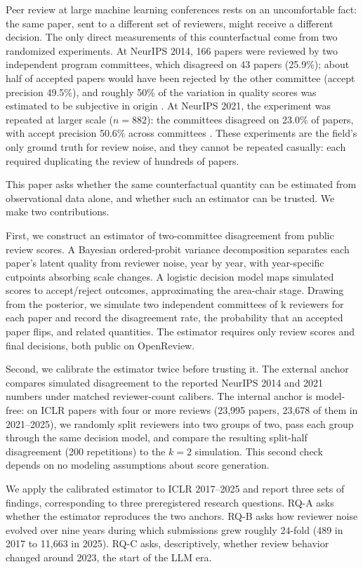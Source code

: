 \documentclass[10pt]{article}
\begin{document}
Peer review at large machine learning conferences rests on an uncomfortable fact: the same paper, sent to a different set of reviewers, might receive a different decision. The only direct measurements of this counterfactual come from two randomized experiments. At NeurIPS 2014, 166 papers were reviewed by two independent program committees, which disagreed on 43 papers (25.9\%); about half of accepted papers would have been rejected by the other committee (accept precision 49.5\%), and roughly 50\% of the variation in quality scores was estimated to be subjective in origin \citep{cortes2021}. At NeurIPS 2021, the experiment was repeated at larger scale ($n=882$): the committees disagreed on 23.0\% of papers, with accept precision 50.6\% across committees \citep{beygelzimer2023}. These experiments are the field's only ground truth for review noise, and they cannot be repeated casually: each required duplicating the review of hundreds of papers.

This paper asks whether the same counterfactual quantity can be estimated from observational data alone, and whether such an estimator can be trusted. We make two contributions.

First, we construct an estimator of two-committee disagreement from public review scores. A Bayesian ordered-probit variance decomposition separates each paper's latent quality from reviewer noise, year by year, with year-specific cutpoints absorbing scale changes. A logistic decision model maps simulated scores to accept/reject outcomes, approximating the area-chair stage. Drawing from the posterior, we simulate two independent committees of k reviewers for each paper and record the disagreement rate, the probability that an accepted paper flips, and related quantities. The estimator requires only review scores and final decisions, both public on OpenReview.

Second, we calibrate the estimator twice before trusting it. The external anchor compares simulated disagreement to the reported NeurIPS 2014 and 2021 numbers under matched reviewer-count calibers. The internal anchor is model-free: on ICLR papers with four or more reviews (23,995 papers, 23,678 of them in 2021--2025), we randomly split reviewers into two groups of two, pass each group through the same decision model, and compare the resulting split-half disagreement (200 repetitions) to the $k=2$ simulation. This second check depends on no modeling assumptions about score generation.

We apply the calibrated estimator to ICLR 2017--2025 and report three sets of findings, corresponding to three preregistered research questions. RQ-A asks whether the estimator reproduces the two anchors. RQ-B asks how reviewer noise evolved over nine years during which submissions grew roughly $24$-fold (489 in 2017 to 11,663 in 2025). RQ-C asks, descriptively, whether review behavior changed around 2023, the start of the LLM era.
\end{document}
